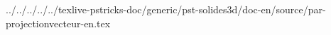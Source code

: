 ../../../../../texlive-pstricks-doc/generic/pst-solides3d/doc-en/source/par-projectionvecteur-en.tex